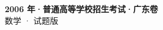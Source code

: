 \documentclass[zihao=-4, a4paper]{ctexart}
\begin{document}
\begin{center}
  {\Large\bfseries 2006 年·普通高等学校招生考试·广东卷}\\[4pt]
  {\large 数学 · 试题版}
\end{center}
\medskip
{}

\end{document}
